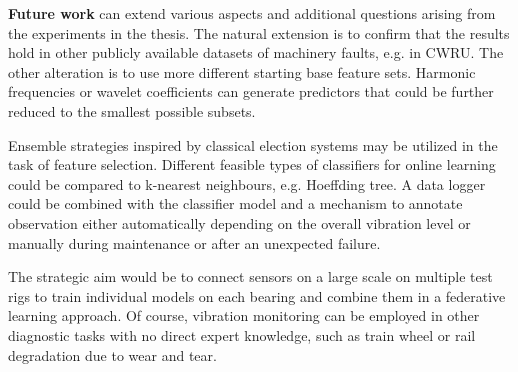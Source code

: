 \textbf{Future work} can extend various aspects and additional questions arising from the experiments in the thesis. The natural extension is to confirm that the results hold in other publicly available datasets of machinery faults, e.g. in CWRU. The other alteration is to use more different starting base feature sets. Harmonic frequencies or wavelet coefficients can generate predictors that could be further reduced to the smallest possible subsets. 

Ensemble strategies inspired by classical election systems may be utilized in the task of feature selection. Different feasible types of classifiers for online learning could be compared to k-nearest neighbours, e.g. Hoeffding tree. A data logger could be combined with the classifier model and a mechanism to annotate observation either automatically depending on the overall vibration level or manually during maintenance or after an unexpected failure.

The strategic aim would be to connect sensors on a large scale on multiple test rigs to train individual models on each bearing and combine them in a federative learning approach. Of course, vibration monitoring can be employed in other diagnostic tasks with no direct expert knowledge, such as train wheel or rail degradation due to wear and tear.